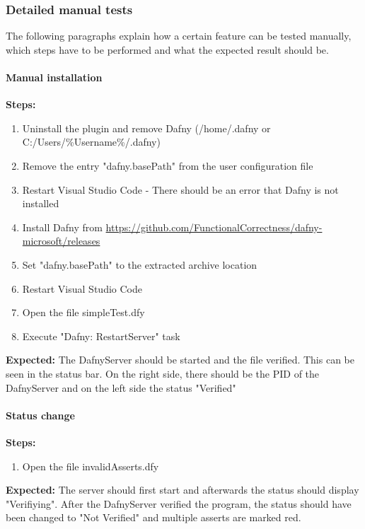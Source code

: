 \subsubsection{Detailed manual tests}
The following paragraphs explain how a certain feature can be tested manually, which steps have to be performed and what the expected result should be.

\paragraph{Manual installation}
\textbf{\newline Steps:}
\begin{enumerate}
	\item Uninstall the plugin and remove Dafny (/home/.dafny or C:/Users/\%Username\%/.dafny)
	\item Remove the entry "dafny.basePath" from the user configuration file 
	\item Restart Visual Studio Code - There should be an error that Dafny is not installed
	\item Install Dafny from \href{https://github.com/FunctionalCorrectness/dafny-microsoft/releases}{https://github.com/FunctionalCorrectness/dafny-microsoft/releases}
	\item Set "dafny.basePath" to the extracted archive location
	\item Restart Visual Studio Code
	\item Open the file simpleTest.dfy
	\item Execute "Dafny: RestartServer" task
\end{enumerate}
\textbf{\newline Expected:}
The DafnyServer should be started and the file verified. This can be seen in the status bar. On the right side, there should be the PID of the DafnyServer and on the left side the status "Verified"

\paragraph{Status change}
\textbf{\newline Steps:}
\begin{enumerate}
	\item Open the file invalidAsserts.dfy
	
\end{enumerate}
\textbf{\newline Expected:}
The server should first start and afterwards the status should display "Verifiying". After the DafnyServer verified the program, the status should have been changed to "Not Verified" and multiple asserts are marked red. 

